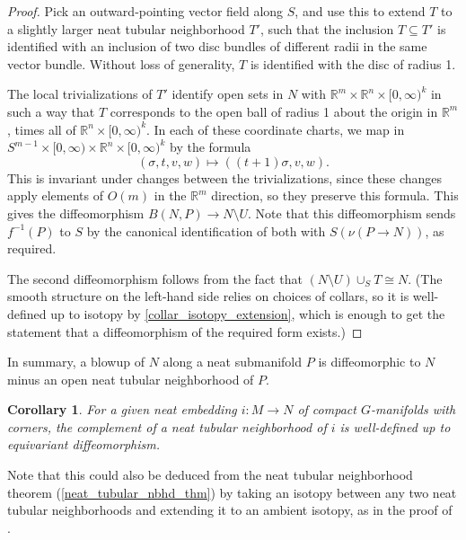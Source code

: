 \documentclass[11pt]{amsart}
\newtheorem{cor}{Corollary}[section]
\theoremstyle{definition}
\numberwithin{equation}{section}
\numberwithin{figure}{section}
\newcommand{\R}{\mathbb R}
\begin{document}
\begin{proof}
	Pick an outward-pointing vector field along $S$, and use this to extend $T$ to a slightly larger neat tubular neighborhood $T'$, such that the inclusion $T \subseteq T'$ is identified with an inclusion of two disc bundles of different radii in the same vector bundle. Without loss of generality, $T$ is identified with the disc of radius 1.
	
	The local trivializations of $T'$ identify open sets in $N$ with $\R^m \times \R^{n} \times [0,\infty)^k$ in such a way that $T$ corresponds to the open ball of radius 1 about the origin in $\R^m$, times all of $\R^{n} \times [0,\infty)^k$. In each of these coordinate charts, we map in $S^{m-1} \times [0,\infty) \times \R^{n} \times [0,\infty)^k$ by the formula
	\[ (\sigma,t,v,w) \mapsto ((t+1)\sigma,v,w). \]
	This is invariant under changes between the trivializations, since these changes apply elements of $O(m)$ in the $\R^m$ direction, so they preserve this formula. This gives the diffeomorphism $B(N,P) \to N \setminus U$. Note that this diffeomorphism sends $f^{-1}(P)$ to $S$ by the canonical identification of both with $S(\nu(P \to N))$, as required.
	
	The second diffeomorphism follows from the fact that $(N \setminus U) \cup_{S} T \cong N$. (The smooth structure on the left-hand side relies on choices of collars, so it is well-defined up to isotopy by \autoref{collar_isotopy_extension}, which is enough to get the statement that a diffeomorphism of the required form exists.)
\end{proof}

In summary, a blowup of $N$ along a neat submanifold $P$ is diffeomorphic to $N$ minus an open neat tubular neighborhood of $P$.

\begin{cor}\label{neat_complement_well_defined}
	For a given neat embedding $i\colon M \to N$ of compact $G$-manifolds with corners, the complement of a neat tubular neighborhood of $i$ is well-defined up to equivariant diffeomorphism.
\end{cor}

Note that this could also be deduced from the neat tubular neighborhood theorem (\autoref{neat_tubular_nbhd_thm}) by taking an isotopy between any two neat tubular neighborhoods and extending it to an ambient isotopy, as in the proof of \cite[Lem 2.55]{GIMM1}.
\end{document}
